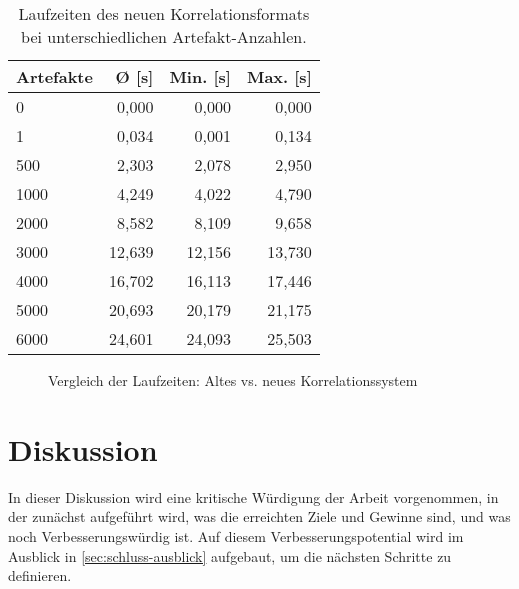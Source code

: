 \begin{table}[h!]
    \centering
    \begin{tabular}{l r r r}
        \toprule
        \textbf{Artefakte} & \textbf{Ø [s]} & \textbf{Min. [s]} & \textbf{Max. [s]} \\
        \midrule
        0                  & 0,000          & 0,000             & 0,000             \\
        1                  & 0,034          & 0,001             & 0,134             \\
        500                & 2,303          & 2,078             & 2,950             \\
        1000               & 4,249          & 4,022             & 4,790             \\
        2000               & 8,582          & 8,109             & 9,658             \\
        3000               & 12,639         & 12,156            & 13,730            \\
        4000               & 16,702         & 16,113            & 17,446            \\
        5000               & 20,693         & 20,179            & 21,175            \\
        6000               & 24,601         & 24,093            & 25,503            \\
        \bottomrule
    \end{tabular}
    \caption{Laufzeiten des neuen Korrelationsformats bei unterschiedlichen Artefakt-Anzahlen.}
    \label{tab:new-correlation-performance}
\end{table}

\begin{figure}[htbp]
    \centering
    \makebox[\textwidth]{}
    \caption{Vergleich der Laufzeiten: Altes vs. neues Korrelationssystem}
    \label{fig:correlation-performance-comparison}
\end{figure}

\section{Diskussion}

In dieser Diskussion wird eine kritische Würdigung der Arbeit vorgenommen, in der zunächst aufgeführt wird, was die erreichten Ziele und Gewinne sind, und was noch Verbesserungswürdig ist.
Auf diesem Verbesserungspotential wird im Ausblick in \autoref{sec:schluss-ausblick} aufgebaut, um die nächsten Schritte zu definieren.

